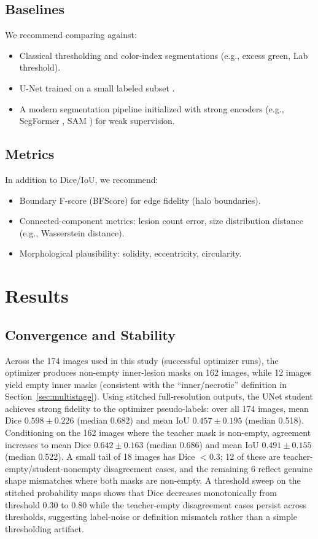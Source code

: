 \documentclass[journal]{IEEEtran}
\begin{document}
\subsection{Baselines}
We recommend comparing against:
\begin{itemize}
    \item Classical thresholding and color-index segmentations (e.g., excess green, Lab threshold).
    \item U-Net trained on a small labeled subset \cite{ronneberger2015u}.
    \item A modern segmentation pipeline initialized with strong encoders (e.g., SegFormer \cite{xie2021segformer}, SAM \cite{kirillov2023segment}) for weak supervision.
\end{itemize}

\subsection{Metrics}
In addition to Dice/IoU, we recommend:
\begin{itemize}
    \item Boundary F-score (BFScore) for edge fidelity (halo boundaries).
    \item Connected-component metrics: lesion count error, size distribution distance (e.g., Wasserstein distance).
    \item Morphological plausibility: solidity, eccentricity, circularity.
\end{itemize}

\section{Results}
\subsection{Convergence and Stability}
Across the 174 images used in this study (successful optimizer runs), the optimizer produces non-empty inner-lesion masks on 162 images, while 12 images yield empty inner masks (consistent with the ``inner/necrotic'' definition in Section~\ref{sec:multistage}).
Using stitched full-resolution outputs, the UNet student achieves strong fidelity to the optimizer pseudo-labels: over all 174 images, mean Dice $0.598\pm0.226$ (median 0.682) and mean IoU $0.457\pm0.195$ (median 0.518).
Conditioning on the 162 images where the teacher mask is non-empty, agreement increases to mean Dice $0.642\pm0.163$ (median 0.686) and mean IoU $0.491\pm0.155$ (median 0.522).
A small tail of 18 images has Dice $<0.3$; 12 of these are teacher-empty/student-nonempty disagreement cases, and the remaining 6 reflect genuine shape mismatches where both masks are non-empty.
A threshold sweep on the stitched probability maps shows that Dice decreases monotonically from threshold 0.30 to 0.80 while the teacher-empty disagreement cases persist across thresholds, suggesting label-noise or definition mismatch rather than a simple thresholding artifact.
\end{document}
